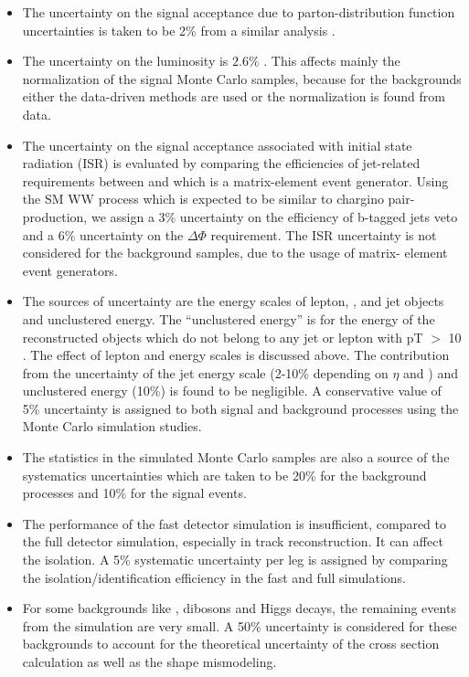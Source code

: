 \begin{itemize}
\item The uncertainty on the signal acceptance due to parton-distribution function uncertainties 
  is taken to be 2\% from a similar analysis \cite{Khachatryan:2014qwa}.

\item The uncertainty on the luminosity  is $2.6\%$ \cite{CMS-PAS-LUM-13-001}.  This affects mainly the
  normalization of the signal Monte Carlo samples, because for the backgrounds  either  the data-driven methods are used or 
the normalization is found from data.

\item The uncertainty on the signal acceptance associated with initial state radiation (ISR)
is evaluated by comparing the efficiencies of jet-related requirements between \PYTHIA
 and \MADGRAPH which is a matrix-element event generator. Using the SM WW process which
 is expected to be similar to chargino pair-production, we assign a 3\% uncertainty on 
the efficiency of  b-tagged jets veto and a 6\% uncertainty on the $\Delta \Phi$ requirement. The ISR
 uncertainty is not considered for the background samples, due to the usage of matrix-
 element event generators.

\item The sources of \MPT uncertainty are the energy scales of lepton, \Tau, and jet
objects and unclustered energy.  The ``unclustered energy'' is for the energy of the reconstructed objects which
 do not belong to any jet or lepton with pT $>$ 10 \GeV. The effect of lepton and \Tau
 energy scales is discussed above. The contribution from the uncertainty of the jet energy scale (2-10\% depending on $\eta$  and \PT) and
 unclustered energy (10\%) is found to be negligible. A conservative value of 5\% uncertainty
 is assigned to both signal and background processes using the Monte
 Carlo simulation studies.

\item The statistics in the simulated Monte Carlo samples are also a
 source of the systematics uncertainties which are taken to be 20\% for the background processes and 10\% for the signal events.

\item The performance of the fast detector simulation is insufficient, compared to the full detector simulation, especially in
 track reconstruction. It can affect the \Tau isolation. A 5\% systematic uncertainty per
 \Tau leg is assigned by comparing the \Tau isolation/identification efficiency in the fast
 and full simulations.

\item For some backgrounds like \ttbar,  dibosons and Higgs decays, the remaining 
events from the simulation are very small. A 50\% uncertainty is considered for these backgrounds to account for the theoretical uncertainty of the
cross section calculation as well as the shape mismodeling.
\end{itemize}


